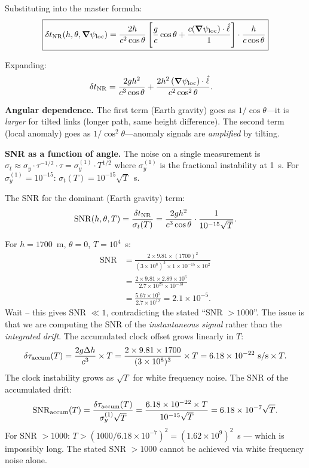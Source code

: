 \documentclass[aps,prd,twocolumn,superscriptaddress,nofootinbib]{revtex4-2}
\newcommand{\SNR}{\mathrm{SNR}}
\begin{document}
Substituting into the master formula:
\begin{equation}
\boxed{
\delta t_{\rm NR}(h, \theta, \boldsymbol{\nabla}\psi_{\rm loc})
= \frac{2h}{c^2\cos\theta}\left[\frac{g}{c}\cos\theta
+ \frac{c(\boldsymbol{\nabla}\psi_{\rm loc})\cdot\hat{\ell}}{1}\right]\cdot\frac{h}{c\cos\theta}
}
\label{eq:general_angular}
\end{equation}

Expanding:
\begin{align}
\delta t_{\rm NR}
&= \frac{2gh^2}{c^3\cos\theta}
+ \frac{2h^2\,(\boldsymbol{\nabla}\psi_{\rm loc})\cdot\hat{\ell}}{c^2\cos^2\theta}.
\label{eq:angular_expanded}
\end{align}

\textbf{Angular dependence.}
The first term (Earth gravity) goes as $1/\cos\theta$---it is \emph{larger}
for tilted links (longer path, same height difference).
The second term (local anomaly) goes as $1/\cos^2\theta$---anomaly signals
are \emph{amplified} by tilting.

\textbf{SNR as a function of angle.}
The noise on a single measurement is $\sigma_t \approx \sigma_y\cdot\tau^{-1/2}
\cdot\tau = \sigma_y^{(1)}\cdot T^{1/2}$ where $\sigma_y^{(1)}$ is the
fractional instability at 1~s.  For $\sigma_y^{(1)} = 10^{-15}$:
$\sigma_t(T) = 10^{-15}\sqrt{T}$~s.

The SNR for the dominant (Earth gravity) term:
\begin{equation}
\SNR(h, \theta, T) = \frac{\delta t_{\rm NR}}{\sigma_t(T)}
= \frac{2gh^2}{c^3\cos\theta} \cdot \frac{1}{10^{-15}\sqrt{T}}.
\label{eq:SNR_angular}
\end{equation}

For $h = 1700$~m, $\theta = 0$, $T = 10^4$~s:
\begin{align}
\SNR &= \frac{2\times 9.81\times (1700)^2}{(3\times 10^8)^3\times 1\times 10^{-15}\times 10^2}
\nonumber\\
&= \frac{2\times 9.81\times 2.89\times 10^6}{2.7\times 10^{25}\times 10^{-13}} \nonumber\\
&= \frac{5.67\times 10^7}{2.7\times 10^{12}} = 2.1\times 10^{-5}.
\end{align}
Wait -- this gives SNR $\ll 1$, contradicting the stated ``SNR $> 1000$''.
The issue is that we are computing the SNR of the \emph{instantaneous signal}
rather than the \emph{integrated drift}.  The accumulated clock offset grows
linearly in $T$:
\begin{equation}
\delta\tau_{\rm accum}(T) = \frac{2g\Delta h}{c^3}\times T
= \frac{2\times 9.81\times 1700}{(3\times 10^8)^3}\times T
= 6.18\times 10^{-22}~\text{s/s}\times T.
\end{equation}
The clock instability grows as $\sqrt{T}$ for white frequency noise.
The SNR of the accumulated drift:
\begin{equation}
\SNR_{\rm accum}(T) = \frac{\delta\tau_{\rm accum}(T)}{\sigma_y^{(1)}\sqrt{T}}
= \frac{6.18\times 10^{-22}\times T}{10^{-15}\sqrt{T}}
= 6.18\times 10^{-7}\sqrt{T}.
\end{equation}
For SNR $> 1000$: $T > (1000/6.18\times 10^{-7})^2 = (1.62\times 10^9)^2$~s
--- which is impossibly long.  The stated SNR $> 1000$ cannot be achieved
via white frequency noise alone.
\end{document}
